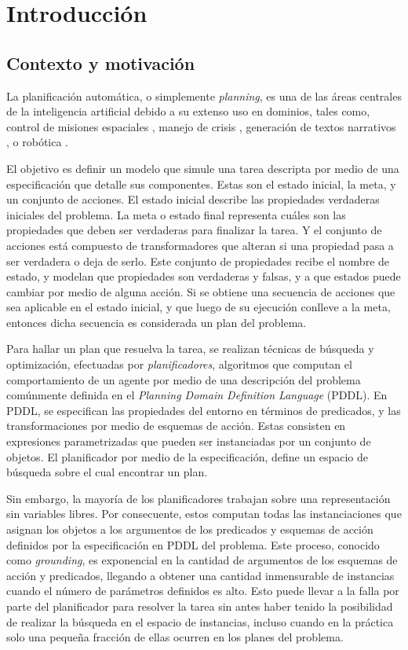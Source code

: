 \chapter{Introducción}
\label{ch:into}

\section{Contexto y motivación}
La planificación automática, o simplemente \emph{planning}, es una de las áreas
centrales de la inteligencia artificial debido a su extenso uso en dominios,
tales como, control de misiones espaciales \citep{RabideauG-et-al-2001}, manejo
de crisis \citep{Bienkowki-1995}, generación de textos narrativos
\citep{Goudoulakis-et-al-2016}, o robótica \citep{Munoz-et-al-2016}.

El objetivo es definir un modelo que simule una tarea descripta por medio de una
especificación que detalle sus componentes. Estas son el estado inicial, la
meta, y un conjunto de acciones. El estado inicial describe las propiedades
verdaderas iniciales del problema. La meta o estado final representa cuáles son
las propiedades que deben ser verdaderas para finalizar la tarea. Y el conjunto
de acciones está compuesto de transformadores que alteran si una propiedad pasa
a ser verdadera o deja de serlo. Este conjunto de propiedades recibe el nombre
de estado, y modelan que propiedades son verdaderas y falsas, y a que estados
puede cambiar por medio de alguna acción. Si se obtiene una secuencia de
acciones que sea aplicable en el estado inicial, y que luego de su ejecución
conlleve a la meta, entonces dicha secuencia es considerada un plan del
problema.

Para hallar un plan que resuelva la tarea, se realizan técnicas de búsqueda y
optimización, efectuadas por \emph{planificadores}, algoritmos que computan el
comportamiento de un agente por medio de una descripción del problema comúnmente
definida en el \emph{Planning Domain Definition Language} (PDDL). En PDDL, se
especifican las propiedades del entorno en términos de predicados, y las
transformaciones por medio de esquemas de acción. Estas consisten en expresiones
parametrizadas que pueden ser instanciadas por un conjunto de objetos. El
planificador por medio de la especificación, define un espacio de búsqueda sobre
el cual encontrar un plan.

Sin embargo, la mayoría de los planificadores trabajan sobre una representación
sin variables libres. Por consecuente, estos computan todas las instanciaciones
que asignan los objetos a los argumentos de los predicados y esquemas de acción
definidos por la especificación en PDDL del problema. Este proceso, conocido
como \emph{grounding}, es exponencial en la cantidad de argumentos de los
esquemas de acción y predicados, llegando a obtener una cantidad inmensurable de
instancias cuando el número de parámetros definidos es alto. Esto puede llevar a
la falla por parte del planificador para resolver la tarea sin antes haber
tenido la posibilidad de realizar la búsqueda en el espacio de instancias,
incluso cuando en la práctica solo una pequeña fracción de ellas ocurren en los
planes del problema.
\citep{Gnad_Torralba_Dominguez_Areces_Bustos_2019}

